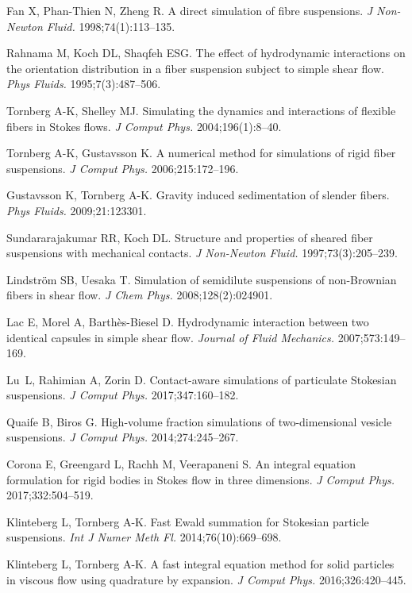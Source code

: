\documentclass[AMA,STIX1COL]{WileyNJD-v2}
\begin{document}
\begin{thebibliography}{10}
Fan X, Phan-Thien N, Zheng R. A direct simulation of fibre suspensions.  {\it J
  Non-Newton Fluid. }1998;74(1):113--135.

Rahnama M, Koch DL, Shaqfeh ESG. The effect of hydrodynamic interactions on the
  orientation distribution in a fiber suspension subject to simple shear flow.
  {\it Phys Fluids. }1995;7(3):487--506.

Tornberg A-K, Shelley MJ. {Simulating the dynamics and interactions of flexible
  fibers in Stokes flows}.  {\it J Comput Phys. }2004;196(1):8--40.

Tornberg A-K, Gustavsson K. A numerical method for simulations of rigid fiber
  suspensions.  {\it J Comput Phys. }2006;215:172--196.

Gustavsson K, Tornberg A-K. Gravity induced sedimentation of slender fibers.
  {\it Phys Fluids. }2009;21:123301.

Sundararajakumar RR, Koch DL. Structure and properties of sheared fiber
  suspensions with mechanical contacts.  {\it J Non-Newton Fluid.
  }1997;73(3):205--239.

Lindstr\"{o}m SB, Uesaka T. {Simulation of semidilute suspensions of
  non-Brownian fibers in shear flow}.  {\it J Chem Phys. }2008;128(2):024901.

Lac E, Morel A, Barth{\`e}s-Biesel D. Hydrodynamic interaction between two
  identical capsules in simple shear flow.  {\it Journal of Fluid Mechanics.
  }2007;573:149--169.

Lu~L, Rahimian A, Zorin D. Contact-aware simulations of particulate {S}tokesian
  suspensions.  {\it J Comput Phys. }2017;347:160--182.

Quaife B, Biros G. High-volume fraction simulations of two-dimensional vesicle
  suspensions.  {\it J Comput Phys. }2014;274:245--267.

Corona E, Greengard L, Rachh M, Veerapaneni S. {An integral equation
  formulation for rigid bodies in Stokes flow in three dimensions}.  {\it J
  Comput Phys. }2017;332:504--519.

Klinteberg L, Tornberg A-K. {Fast Ewald summation for Stokesian particle
  suspensions}.  {\it Int J Numer Meth Fl. }2014;76(10):669--698.

Klinteberg L, Tornberg A-K. A fast integral equation method for solid particles
  in viscous flow using quadrature by expansion.  {\it J Comput Phys.
  }2016;326:420--445.


\end{thebibliography}
\end{document}
